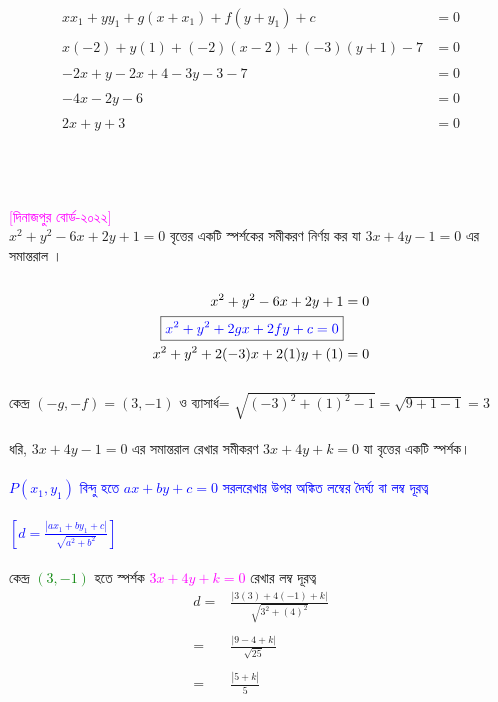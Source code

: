 \documentclass{article}
\begin{document}
\\
\begin{align*}
	xx_1+yy_1+g(x+x_1)+f(y+y_1)+c&=0\\
	\\
	x(-2)+y(1)+(-2)(x-2)+(-3)(y+1)-7&=0\\
	\\
-2x+y-2x+4-3y-3-7&=0\\
	\\
	-4x-2y-6&=0\\
	\\
2x+y+3&=0 
\end{align*}
\\ 
\\
\\ 
\textcolor{magenta}{[দিনাজপুর বোর্ড-২০২২]}\\ 
$x^2+y^2-6x+2y+1=0$ বৃত্তের একটি স্পর্শকের সমীকরণ নির্ণয় কর যা $3x+4y-1=0$ এর সমান্তরাল । \\ 
	\\
		\begin{align*}
	x^2+y^2-6x+2y+1&=0\\
		\boxed{\textcolor{blue}{x^2+y^2+2gx+2fy+c=0}}&\\
		x^2+y^2+2(-3)x+2(1)y+(1)&=0
	\end{align*}
	\\
	কেন্দ্র 	$(-g,-f)=(3,-1)$ ও ব্যাসার্ধ= $\sqrt{(-3)^2+(1)^2-1}=\sqrt{9+1-1}=3$\\
	\\ 
	ধরি,  $3x+4y-1=0$ এর সমান্তরাল রেখার সমীকরণ  $3x+4y+k=0$ যা বৃত্তের একটি স্পর্শক।\\
	\\  
	\textcolor{blue}{$P(x_1,y_1)$ বিন্দু হতে  $ax+by+c=0$ সরলরেখার উপর অঙ্কিত লম্বের দৈর্ঘ্য বা লম্ব দূরত্ব \\
		\\
		$\left[d=\frac{|ax_1+by_1+c|}{\sqrt{a^2+b^2}}\right]$}\\
	\\
	কেন্দ্র \textcolor{green}{$(3,-1)$} হতে স্পর্শক \textcolor{magenta}{$3x+4y+k=0$}  রেখার লম্ব দূরত্ব \\
	\begin{align*}
		d=	&\frac{|3(3)+4(-1)+k|}{\sqrt{3^2+(4)^2}}\\
		\\
		=	&	\frac{|9-4+k|}{\sqrt{25}}\\
		\\
		=	&	\frac{|5+k|}{5}\\
		\end{align*}
\end{document}

